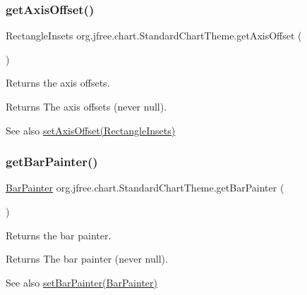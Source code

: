 \subsubsection{\texorpdfstring{get\+Axis\+Offset()}{getAxisOffset()}}
{\footnotesize\ttfamily Rectangle\+Insets org.\+jfree.\+chart.\+Standard\+Chart\+Theme.\+get\+Axis\+Offset (\begin{DoxyParamCaption}{ }\end{DoxyParamCaption})}

Returns the axis offsets.

\begin{DoxyReturn}{Returns}
The axis offsets (never {\ttfamily null}).
\end{DoxyReturn}
\begin{DoxySeeAlso}{See also}
\mbox{\hyperlink{classorg_1_1jfree_1_1chart_1_1_standard_chart_theme_a763e33e247502dfb414be9d1052b8f00}{set\+Axis\+Offset(\+Rectangle\+Insets)}} 
\end{DoxySeeAlso}
\mbox{\label{classorg_1_1jfree_1_1chart_1_1_standard_chart_theme_a46efbe98dbf20d45f5ec7c27e8b4b03e}} 
\subsubsection{\texorpdfstring{get\+Bar\+Painter()}{getBarPainter()}}
{\footnotesize\ttfamily \mbox{\hyperlink{interfaceorg_1_1jfree_1_1chart_1_1renderer_1_1category_1_1_bar_painter}{Bar\+Painter}} org.\+jfree.\+chart.\+Standard\+Chart\+Theme.\+get\+Bar\+Painter (\begin{DoxyParamCaption}{ }\end{DoxyParamCaption})}

Returns the bar painter.

\begin{DoxyReturn}{Returns}
The bar painter (never {\ttfamily null}).
\end{DoxyReturn}
\begin{DoxySeeAlso}{See also}
\mbox{\hyperlink{classorg_1_1jfree_1_1chart_1_1_standard_chart_theme_afba641eafa062852fef81ca19fd04cfe}{set\+Bar\+Painter(\+Bar\+Painter)}} 
\end{DoxySeeAlso}
\mbox{\label{classorg_1_1jfree_1_1chart_1_1_standard_chart_theme_ac6f4811b0f2f544ba0c6b8a2792dd3ff}} 
